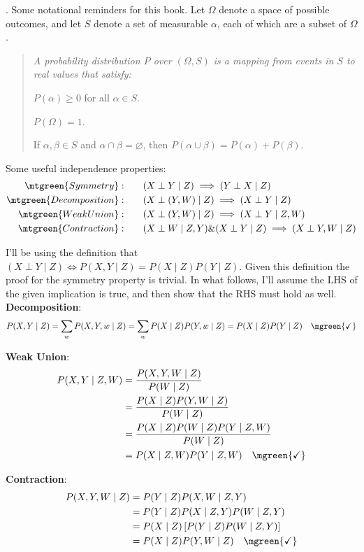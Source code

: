 \documentclass[11pt]{article}
\newcommand\myspace[1][]{\vspace{#1\bigskipamount}}
\newcommand\p{\Needspace{10\baselineskip} \noindent}
\begin{document}
\myspace
\p {}. Some notational reminders for this book. Let $\Omega$ denote a space of possible outcomes, and let $S$ denote a set of measurable  $\alpha$, each of which are a subset of $\Omega$.
\vspace{-0.5em}
\begin{quote}
	{\footnotesize\itshape 
		A probability distribution $P$ over $(\Omega, S)$ is a mapping from events in $S$ to real values that satisfy:
		\begin{compactitem}
			\item $P(\alpha) \ge 0$ for all $\alpha \in S$. 
			\item $P(\Omega) = 1$.
			\item If $\alpha, \beta \in S$ and $\alpha \cap \beta = \varnothing$, then $P(\alpha \cup \beta) = P(\alpha) + P(\beta)$.
		\end{compactitem}	
	}
\end{quote}
Some useful independence properties:
\begin{align}
	 \mtgreen{Symmetry}:\qquad			&(X \perp Y \mid Z) \implies (Y \perp X \mid Z) \\
	 \mtgreen{Decomposition}:\qquad	&(X \perp (Y, W) \mid Z) \implies (X \perp Y \mid Z)  \\
	 \mtgreen{Weak Union}:\qquad 		&(X \perp (Y, W) \mid Z) \implies (X \perp Y \mid Z, W) \\
	 \mtgreen{Contraction}:\qquad 	&(X \perp W \mid Z, Y) \& (X \perp Y \mid Z) \implies (X \perp Y, W \mid Z)
\end{align}
\begin{example}
I'll be using the definition that $(X \perp Y \mid Z) \Leftrightarrow P(X, Y \mid Z)=P(X \mid Z)P(Y \mid Z)$. Given this definition the proof for the symmetry property is trivial. In what follows, I'll assume the LHS of the given implication is true, and then show that the RHS must hold as well. \\

\textbf{Decomposition}:
$$P(X, Y \mid Z) = \sum_w P(X, Y, w \mid Z) = \sum_w P(X \mid Z) P(Y, w \mid Z)  = P(X \mid Z) P(Y \mid Z) \quad \mgreen{\checkmark}$$

\textbf{Weak Union}: 
\begin{align}
	P(X, Y \mid Z, W) &= \frac{ P(X, Y, W \mid Z) }{ P(W \mid Z) } \\
	&= \frac{ P(X \mid Z) P(Y, W \mid Z) }{ P(W \mid Z) } \\
	&= \frac{  P(X \mid Z) P(W \mid Z) P(Y \mid Z, W) }{ P(W \mid Z) } \\
	&= P(X \mid Z, W) P(Y \mid Z, W) \quad \mgreen{\checkmark}
\end{align}

\p \textbf{Contraction}: 
\begin{align}
	P(X, Y, W \mid Z) 
	&= P(Y \mid Z) P(X, W \mid Z, Y)	\\
	&= P(Y \mid Z) P(X \mid Z, Y) P(W \mid Z, Y) \\
	&= P(X \mid Z) \left[  P(Y \mid Z) P(W \mid Z, Y) \right] \\
	&= P(X \mid Z) P(Y, W \mid Z) \quad \mgreen{\checkmark}
\end{align}
\end{example}
\end{document}
